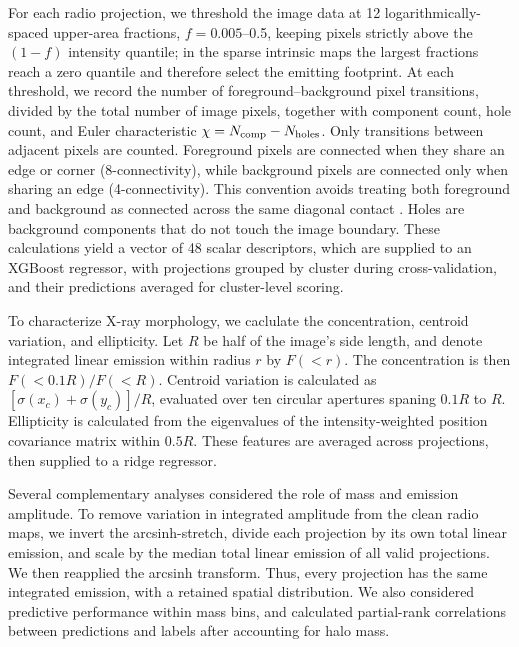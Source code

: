 For each radio projection, we threshold the image data at 12 logarithmically-spaced upper-area fractions, $f=0.005$--0.5, keeping pixels strictly above the $(1-f)$ intensity quantile; in the sparse intrinsic maps the largest fractions reach a zero quantile and therefore select the emitting footprint.
At each threshold, we record the number of foreground--background pixel transitions, divided by the total number of image pixels, together with component count, hole count, and Euler characteristic $\chi=N_{\rm comp}-N_{\rm holes}$.
Only transitions between adjacent pixels are counted.
Foreground pixels are connected when they share an edge or corner (8-connectivity), while background pixels are connected only when sharing an edge (4-connectivity).
This convention avoids treating both foreground and background as connected across the same diagonal contact \citep{ScikitImageEulerNumber}.
Holes are background components that do not touch the image boundary.
These calculations yield a vector of 48 scalar descriptors, which are supplied to an XGBoost regressor, with projections grouped by cluster during cross-validation, and their predictions averaged for cluster-level scoring.

To characterize X-ray morphology, we caclulate the concentration, centroid variation, and ellipticity.
Let $R$ be half of the image's side length, and denote integrated linear emission within radius $r$ by $F(<r)$.
The concentration is then $F(<0.1R)/F(<R)$.
Centroid variation is calculated as $[\sigma(x_c) + \sigma(y_c)]/R$, evaluated over ten circular apertures spaning $0.1R$ to $R$.
Ellipticity is calculated from the eigenvalues of the intensity-weighted position covariance matrix within $0.5R$.
These features are averaged across projections, then supplied to a ridge regressor.

Several complementary analyses considered the role of mass and emission amplitude.
To remove variation in integrated amplitude from the clean radio maps, we invert the arcsinh-stretch, divide each projection by its own total linear emission, and scale by the median total linear emission of all valid projections.
We then reapplied the arcsinh transform.
Thus, every projection has the same integrated emission, with a retained spatial distribution.
We also considered predictive performance within mass bins, and calculated partial-rank correlations between predictions and labels after accounting for halo mass.

